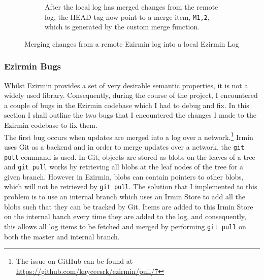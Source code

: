 \documentclass[12pt,a4paper,twoside,openright]{report}
\begin{document}
\begin{figure}
\begin{subfigure}[b]{0.5\textwidth}
			\caption{After the local log has merged changes from the remote log, the HEAD tag now point to a merge item, \texttt{M1,2}, which is generated by the custom merge function.}
		\end{subfigure}
		\caption{Merging changes from a remote Ezirmin log into a local Ezirmin Log}	
		\label{fig:ezirminmerges}
	\end{figure}

	\subsubsection*{Ezirmin Bugs}
	Whilst Ezirmin provides a set of very desirable semantic properties, it is not a widely used library. 
	Consequently, during the course of the project, I encountered a couple of bugs in the Ezirmin codebase which I had to debug and fix.
	In this section I shall outline the two bugs that I encountered the changes I made to the Ezirmin codebase to fix them.\\
	
	The first bug occurs when updates are merged into a log over a network.\footnote{The issue on GitHub can be found at \href{https://github.com/kayceesrk/ezirmin/pull/7}{https://github.com/kayceesrk/ezirmin/pull/7}}
	Irmin uses Git as a backend and in order to merge updates over a network, the \texttt{git pull} command is used.
	In Git, objects are stored as blobs on the leaves of a tree and \texttt{git pull} works by retrieving all blobs at the leaf nodes of the tree for a given branch.
	However in Ezirmin, blobs can contain pointers to other blobs, which will not be retrieved by \texttt{git pull}.
	The solution that I implemented to this problem is to use an internal branch which uses an Irmin Store to add all the blobs such that they can be tracked by Git.
	Items are added to this Irmin Store on the internal banch every time they are added to the log, and consequently, this allows all log items to be fetched and merged by performing \texttt{git pull} on both the master and internal branch.\\
\end{document}
